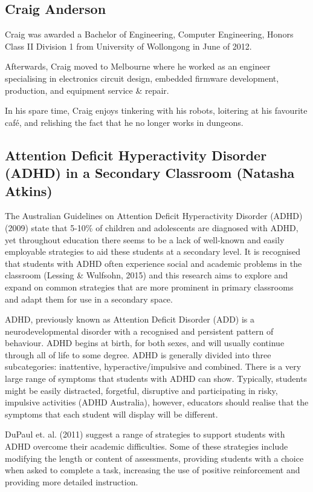 \documentclass[twoside,14pt,a4paper,notitlepage]{memoir}
\begin{document}
\subsection*{Craig Anderson}

Craig was awarded a Bachelor of Engineering, Computer Engineering, Honors Class II Division 1 from University of Wollongong in June of 2012.

Afterwards, Craig moved to Melbourne where he worked as an engineer specialising in electronics circuit design, embedded firmware development, production, and equipment service \& repair.

In his spare time, Craig enjoys tinkering with his robots, loitering at his favourite café, and relishing the fact that he no longer works in dungeons.




\subsection*{Attention Deficit Hyperactivity Disorder (ADHD) in a Secondary Classroom (Natasha Atkins)}
\label{aut:atkins}

The Australian Guidelines on Attention Deficit Hyperactivity Disorder (ADHD) (2009) state that 5-10\% of children and adolescents are diagnosed with ADHD, yet throughout education there seems to be a lack of well-known and easily employable strategies to aid these students at a secondary level. It is recognised that students with ADHD often experience social and academic problems in the classroom (Lessing \& Wulfsohn, 2015) and this research aims to explore and expand on common strategies that are more prominent in primary classrooms and adapt them for use in a secondary space.

ADHD, previously known as Attention Deficit Disorder (ADD) is a neurodevelopmental disorder with a recognised and persistent pattern of behaviour. ADHD begins at birth, for both sexes, and will usually continue through all of life to some degree. ADHD is generally divided into three subcategories: inattentive, hyperactive/impulsive and combined. There is a very large range of symptoms that students with ADHD can show. Typically, students might be easily distracted, forgetful, disruptive and participating in risky, impulsive activities (ADHD Australia), however, educators should realise that the symptoms that each student will display will be different.

DuPaul et. al. (2011) suggest a range of strategies to support students with ADHD overcome their academic difficulties. Some of these strategies include modifying the length or content of assessments, providing students with a choice when asked to complete a task, increasing the use of positive reinforcement and providing more detailed instruction.
\end{document}
